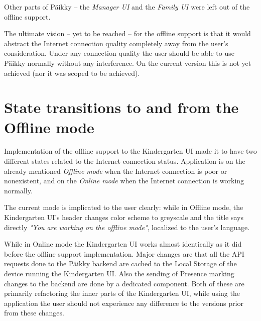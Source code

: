Other parts of Päikky – the \textit{Manager UI} and the \textit{Family UI} were left out of the offline support.

The ultimate vision – yet to be reached – for the offline support is that it would abstract the Internet connection quality completely away from the user's consideration. Under any connection quality the user should be able to use Päikky normally without any interference. On the current version this is not yet achieved (nor it was scoped to be achieved). %




\section{State transitions to and from the Offline mode}

Implementation of the offline support to the Kindergarten UI made it to have two different states related to the Internet connection status. Application is on the already mentioned \textit{Offline mode} when the Internet connection is poor or nonexistent, and on the \textit{Online mode} when the Internet connection is working normally. 

The current mode is implicated to the user clearly: while in Offline mode, the Kindergarten UI's header changes color scheme to greyscale and the title says directly \textit{"You are working on the offline mode"}, localized to the user's language.

While in Online mode the Kindergarten UI works almost identically as it did before the offline support implementation. Major changes are that all the API requests done to the Päikky backend are cached to the Local Storage of the device running the Kindergarten UI. Also the sending of Presence marking changes to the backend are done by a dedicated component. Both of these are primarily refactoring the inner parts of the Kindergarten UI, while using the application the user should not experience any difference to the versions prior from these changes.

